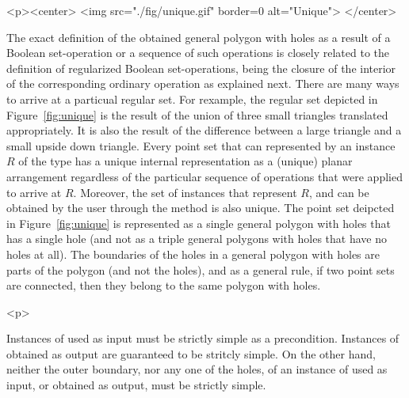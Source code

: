 \begin{ccHtmlOnly}
  <p><center>
    <img src="./fig/unique.gif" border=0 alt="Unique">
  </center>
\end{ccHtmlOnly}
The exact definition of the obtained general polygon with holes as a
result of a Boolean set-operation or a sequence of such operations is
closely related to the definition of regularized Boolean 
set-operations, being the closure of the interior of the corresponding
ordinary operation as explained next.
There are many ways to arrive at a particual regular set. For
rexample, the regular set depicted in Figure~\ref{fig:unique} is the
result of the union of three small triangles translated
appropriately. It is also the result of the difference between a large
triangle and a small upside down triangle. Every point set that can
represented by an instance $R$ of the  type
has a unique internal representation as a (unique) planar arrangement
regardless of the particular sequence of operations that were applied
to arrive at $R$. Moreover, the set of
 instances that represent $R$, and
can be obtained by the user through the
 method is also unique. The point
set deipcted in Figure~\ref{fig:unique} is represented as a single
general polygon with holes that has a single hole (and not as a triple
general polygons with holes that have no holes at all). The boundaries
of the holes in a general polygon with holes are parts of the polygon
(and not the holes), and as a general rule, if two point sets are
connected, then they belong to the same polygon with holes.
 
\begin{ccHtmlOnly}<p>\end{ccHtmlOnly}
Instances of  used as input must be strictly simple
as a precondition. Instances of  obtained as output
are guaranteed to be stritcly simple. On the other hand, neither the outer
boundary, nor any one of the holes, of an instance of
 used as input, or obtained as output,
must be strictly simple.

